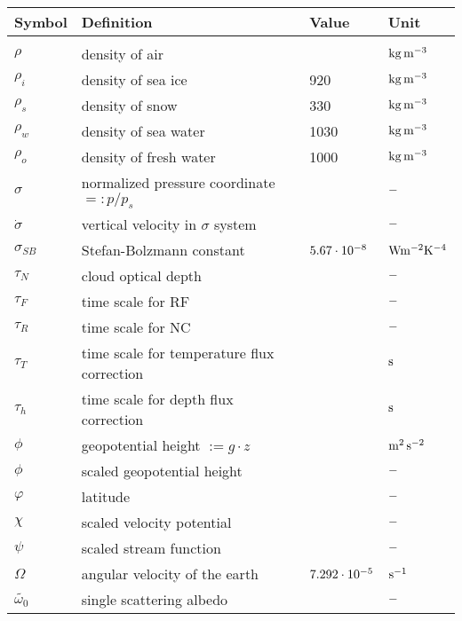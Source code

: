\newpage
\begin{tabular}{llll}
Symbol         & Definition                       & Value   & Unit \\
\hline \\

$\rho$         & density of air                   &         & $\rm kg\,
m^{-3}$ \\
$\rho_i$  & density of sea ice                    & 920          & $\rm kg\, m^{-3}$
\\
$\rho_s$  & density of snow                       & 330          & $\rm kg\, m^{-3}$
\\
$\rho_w$  & density of sea water                  & 1030         & $\rm kg\,
m^{-3}$ \\
$\rho_o$  & density of fresh water                & 1000    & $\rm kg\, m^{-3}$
\\

$\sigma$  & normalized pressure coordinate $=: p/p_s$       &         & $\rm -$ \\
$\dot{\sigma}$  & vertical velocity in $\sigma$ system           &         & $\rm -$ \\
$\sigma_{SB}$ & Stefan-Bolzmann constant & $ 5.67 \cdot 10^{-8}$ &$\rm W m^{-2}K^{-4}$ \\
$\tau_N$  & cloud optical depth    &    &$\rm  -$\\
$\tau_{F}$     & time scale for RF                     &         & $\rm -$ \\
$\tau_{R}$     & time scale for NC                     &         & $\rm -$ \\
$\tau_{T}$     & time scale for temperature flux correction      &         & $\rm s$ \\
$\tau_{h}$     & time scale for depth flux correction            &         & $\rm s$ \\

$\phi$         & geopotential height $:=g\cdot{z}$          &         & $\rm m^2\,
s^{-2}$ \\
$\phi$         & scaled geopotential height            &         & $\rm -$ \\
$\varphi$      & latitude                                   &         & $\rm -$ \\

$\chi$    & scaled velocity potential                  &         & $\rm -$ \\
$\psi$         & scaled stream function                      &         & $\rm -$ \\
$\Omega$  & angular velocity of the earth              & $\rm 7.292\cdot 10^{-5}$ & $\rm
s^{-1}$ \\
$\tilde{\omega_0}$ & single scattering albedo     &    &$\rm- $\\

\end{tabular}

